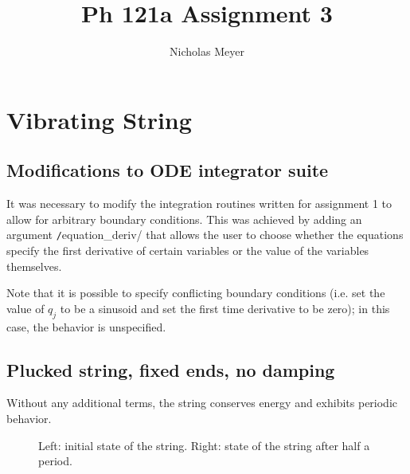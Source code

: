 \documentclass[12pt]{article}
\begin{document}
\title{Ph 121a Assignment 3}
\author{Nicholas Meyer}

\maketitle

\section{Vibrating String}

\subsection{Modifications to ODE integrator suite}

It was necessary to modify the integration routines written for assignment
1 to allow for arbitrary boundary conditions. This was achieved by adding
an argument \texttt/equation_deriv/ that allows the user to choose
whether the equations specify the first derivative of certain variables or
the value of the variables themselves.

Note that it is possible to specify conflicting boundary conditions (i.e.
set the value of $q_j$ to be a sinusoid and set the first time derivative to be
zero); in this case, the behavior is unspecified.

\subsection{Plucked string, fixed ends, no damping}

Without any additional terms, the string conserves energy and exhibits
periodic behavior.

\begin{figure}[H]
  \caption{Left: initial state of the string. Right: state of the string after
    half a period.}
\end{figure}
\end{document}
